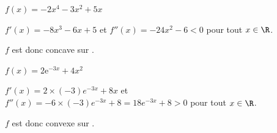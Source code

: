 \documentclass[11pt,a4paper]{article}  %
\begin{document}
		\begin{enumMet}
			\item $f(x)=-2x^{4}-3 x^2+5x$
			\begin{corrBox}
				$f'(x)=-8x^3-6x+5$ et $f''(x)=-24x^2-6<0$ pour tout $x \in \R$.
				
				$f$ est donc concave sur \R.		
			\end{corrBox}
			\item $f(x)=2 \mathrm{e}^{-3 x}+4x^2$
			\begin{corrBox}
				$f'(x)=2\times (-3)e^{-3x}+8x$ et $f''(x)=-6\times (-3)e^{-3x}+8=18e^{-3x}+8>0$ pour tout $x \in \R$.
				
				$f$ est donc convexe sur \R.		
			\end{corrBox}
		\end{enumMet}
	
\end{document}
